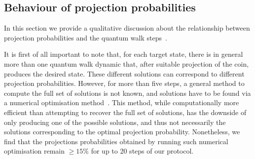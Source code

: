 \subsection{Behaviour of projection probabilities}

In this section we provide a qualitative discussion about the relationship between projection probabilities and the quantum walk steps~\cite{Innocenti2017}.

It is first of all important to note that, for each target state, there is in general more than one quantum walk dynamic that, after suitable projection of the coin, produces the desired state.
These different solutions can correspond to different projection probabilities.
However, for more than five steps, a general method to compute the full set of solutions is not known, and solutions have to be found via a numerical optimisation method~\cite{Innocenti2017}.
This method, while computationally more efficient than attempting to recover the full set of solutions, has the downside of only producing one of the possible solutions, and thus not necessarily the solutions corresponding to the optimal projection probability.
Nonetheless, we find that the projections probabilities obtained by running such numerical optimisation remain $\ge 15\%$ for up to 20 steps of our protocol. 

